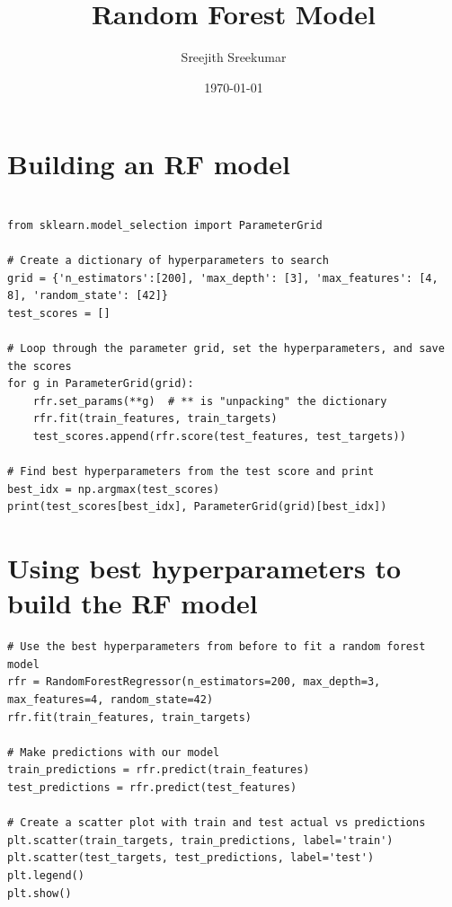 \documentclass[11pt]{article}
\author{Sreejith Sreekumar}
\date{\today}
\title{Random Forest Model}
\begin{document}
\maketitle
\tableofcontents



\section{Building an RF model}
\label{sec:org5ae8580}

\begin{verbatim}

from sklearn.model_selection import ParameterGrid

# Create a dictionary of hyperparameters to search
grid = {'n_estimators':[200], 'max_depth': [3], 'max_features': [4, 8], 'random_state': [42]}
test_scores = []

# Loop through the parameter grid, set the hyperparameters, and save the scores
for g in ParameterGrid(grid):
    rfr.set_params(**g)  # ** is "unpacking" the dictionary
    rfr.fit(train_features, train_targets)
    test_scores.append(rfr.score(test_features, test_targets))

# Find best hyperparameters from the test score and print
best_idx = np.argmax(test_scores)
print(test_scores[best_idx], ParameterGrid(grid)[best_idx])

\end{verbatim}

\section{Using best hyperparameters to build the RF model}
\label{sec:orgbdf1e67}

\begin{verbatim}
# Use the best hyperparameters from before to fit a random forest model
rfr = RandomForestRegressor(n_estimators=200, max_depth=3, max_features=4, random_state=42)
rfr.fit(train_features, train_targets)

# Make predictions with our model
train_predictions = rfr.predict(train_features)
test_predictions = rfr.predict(test_features)

# Create a scatter plot with train and test actual vs predictions
plt.scatter(train_targets, train_predictions, label='train')
plt.scatter(test_targets, test_predictions, label='test')
plt.legend()
plt.show()
\end{verbatim}
\end{document}
